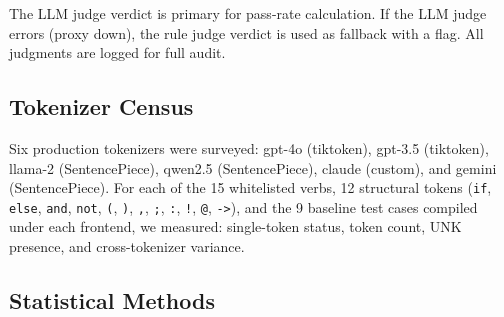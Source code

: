 \documentclass{article}
\begin{document}
The LLM judge verdict is primary for pass-rate calculation. If the LLM judge errors (proxy down), the rule judge verdict is used as fallback with a flag. All judgments are logged for full audit.



\subsection{Tokenizer Census}\label{tokenizer-census}



Six production tokenizers were surveyed: gpt-4o (tiktoken), gpt-3.5 (tiktoken), llama-2 (SentencePiece), qwen2.5 (SentencePiece), claude (custom), and gemini (SentencePiece). For each of the 15 whitelisted verbs, 12 structural tokens (\texttt{if}, \texttt{else}, \texttt{and}, \texttt{not}, \texttt{(}, \texttt{)}, \texttt{,}, \texttt{;}, \texttt{:}, \texttt{!}, \texttt{@}, \texttt{->}), and the 9 baseline test cases compiled under each frontend, we measured: single-token status, token count, UNK presence, and cross-tokenizer variance.



\subsection{Statistical Methods}\label{statistical-methods}
\end{document}
